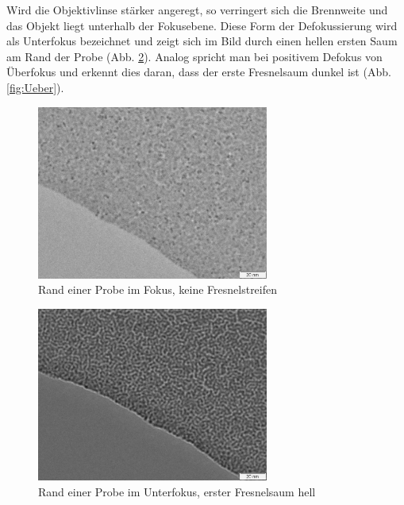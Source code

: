 Wird die Objektivlinse stärker angeregt, so verringert sich die Brennweite und das Objekt liegt unterhalb der Fokusebene. Diese Form der Defokussierung wird als Unterfokus bezeichnet und zeigt sich im Bild durch einen hellen ersten Saum am Rand der Probe  (Abb. \ref{fig:Unter}). Analog spricht man bei positivem Defokus von Überfokus und erkennt dies daran, dass der erste Fresnelsaum dunkel ist  (Abb. \ref{fig:Ueber}).
\begin{figure}[p]
	\vspace{-1.5em}
	\centering
	\includegraphics[width=0.68\textwidth]{data/Im_1.jpg}
	\vspace{-1.5ex}
	\caption{Rand einer Probe im Fokus, keine Fresnelstreifen}			\label{fig:Fokus}
	\vspace{-1em}
\end{figure}

\begin{figure}[p]
	\centering
	\includegraphics[width=0.68\textwidth]{data/Im_3.jpg}
	\vspace{-1.5ex}
	\caption{Rand einer Probe im Unterfokus, erster Fresnelsaum hell}		\label{fig:Unter}
	\vspace{-1em}
\end{figure}

